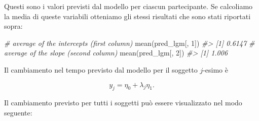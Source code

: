\documentclass[
  11pt,
]{krantz}
\makeatletter
\newenvironment{Shaded}{\begin{snugshade}}{\end{snugshade}}
\newcommand{\CommentTok}[1]{\textcolor[rgb]{0.37,0.37,0.37}{\textit{#1}}}
\newcommand{\DecValTok}[1]{\textcolor[rgb]{0.06,0.06,0.06}{#1}}
\newcommand{\FunctionTok}[1]{\textcolor[rgb]{0,0,0}{#1}}
\newcommand{\NormalTok}[1]{#1}
\newenvironment{kframe}{%
\medskip{}
\setlength{\fboxsep}{.8em}
 \def\at@end@of@kframe{}%
 \ifinner\ifhmode%
  \def\at@end@of@kframe{\end{minipage}}%
  \begin{minipage}{\columnwidth}%
 \fi\fi%
 \def\FrameCommand##1{\hskip\@totalleftmargin \hskip-\fboxsep
 \colorbox{shadecolor}{##1}\hskip-\fboxsep
     \hskip-\linewidth \hskip-\@totalleftmargin \hskip\columnwidth}%
 \MakeFramed {\advance\hsize-\width
   \@totalleftmargin\z@ \linewidth\hsize
   \@setminipage}}%
 {\par\unskip\endMakeFramed%
 \at@end@of@kframe}
\renewenvironment{Shaded}{\begin{kframe}}{\end{kframe}}
\theoremstyle{definition}
\theoremstyle{definition}
\theoremstyle{definition}
\theoremstyle{definition}
\theoremstyle{remark}
\makeatother
\begin{document}
Questi sono i valori previsti dal modello per ciascun partecipante. Se calcoliamo la media di queste variabili otteniamo gli stessi risultati che sono stati riportati sopra:

\begin{Shaded}
\begin{Highlighting}[]
\CommentTok{\# average of the intercepts (first column)}
\FunctionTok{mean}\NormalTok{(pred\_lgm[, }\DecValTok{1}\NormalTok{])}
\CommentTok{\#\textgreater{} [1] 0.6147}
\CommentTok{\# average of the slope (second column)}
\FunctionTok{mean}\NormalTok{(pred\_lgm[, }\DecValTok{2}\NormalTok{])}
\CommentTok{\#\textgreater{} [1] 1.006}
\end{Highlighting}
\end{Shaded}

Il cambiamento nel tempo previsto dal modello per il soggetto \(j\)-esimo è

\[
y_j = \eta_0 + \lambda_j \eta_1.
\]

Il cambiamento previsto per tutti i soggetti può essere visualizzato nel modo seguente:
\end{document}
